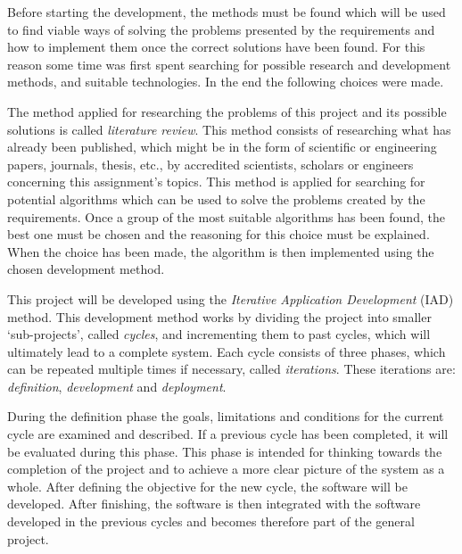 
Before starting the development, the methods must be found which will be used to find viable ways of solving the problems presented by the requirements and how to implement them once the correct solutions have been found. For this reason some time was first spent searching for possible research and development methods, and suitable technologies. In the end the following choices were made.


The method applied for researching the problems of this project and its possible solutions is called \emph{literature review}. This method consists of researching what has already been published, which might be in the form of scientific or engineering papers, journals, thesis, etc., by accredited scientists, scholars or engineers concerning this assignment's topics. 
This method is applied for searching for potential algorithms which can be used to solve the problems created by the requirements. Once a group of the most suitable algorithms has been found, the best one must be chosen and the reasoning for this choice must be explained. When the choice has been made, the algorithm is then implemented using the chosen development method.


This project will be developed using the \emph{Iterative Application Development} (IAD) method. This development method works by dividing the project into smaller `sub-projects', called \emph{cycles}, and incrementing them to past cycles, which will ultimately lead to a complete system. Each cycle consists of three phases, which can be repeated multiple times if necessary, called \emph{iterations}. These iterations are: \emph{definition}, \emph{development} and \emph{deployment}.

During the definition phase the goals, limitations and conditions for the current cycle are examined and described. If a previous cycle has been completed, it will be evaluated during this phase. This phase is intended for thinking towards the completion of the project and to achieve a more clear picture of the system as a whole.
After defining the objective for the new cycle, the software will be developed. After finishing, the software is then integrated with the software developed in the previous cycles and becomes therefore part of the general project.

